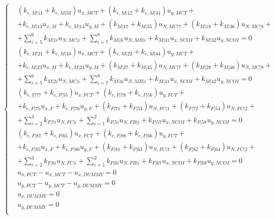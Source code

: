 \documentclass[a4paper]{jpconf}
\begin{document}
\begin{equation}
\begin{cases}
&\left(k_{e,M|11}+k_{e,M|33}\right)u_{x,MCT}+\left(k_{e,M|12}+k_{e,M|34}\right)u_{y,MCT}+\\&+k_{e,M|13}u_{x,M}+k_{e,M|14}u_{y,M}+\left(k_{M|17}+k_{M|35}\right)u_{N,MC|7}+\left(k_{M|18}+k_{M|36}\right)u_{N,MC|8}+\\&+\sum_{i=5}^{6}k_{M|1i}u_{N,MC|i}+\sum_{i=7}^{8}k_{M|3i}u_{N,MB|i}+k_{M|31}u_{x,NCOI}+k_{M|32}u_{y,NCOI}=0\\[10pt]
&\left(k_{e,M|21}+k_{e,M|43}\right)u_{x,MCT}+\left(k_{e,M|22}+k_{e,M|44}\right)u_{y,MCT}+\\&+k_{e,M|23}u_{x,M}+k_{e,M|24}u_{y,M}+\left(k_{M|27}+k_{M|45}\right)u_{N,MC|7}+\left(k_{M|28}+k_{M|46}\right)u_{N,MC|8}+\\&+\sum_{i=5}^{6}k_{M|2i}u_{N,MC|i}+\sum_{i=7}^{8}k_{M|4i}u_{N,MB|i}+k_{M|41}u_{x,NCOI}+k_{M|42}u_{y,NCOI}=0\\[10pt]
&\left(k_{e,F|77}+k_{e,F|55}\right)u_{x,FCT}+\left(k_{e,F|78}+k_{e,F|56}\right)u_{y,FCT}+\\&+k_{e,F|75}u_{x,F}+k_{e,F|76}u_{y,F}+\left(k_{F|71}+k_{F|53}\right)u_{N,FC|1}+\left(k_{F|72}+k_{F|54}\right)u_{N,FC|2}+\\&+\sum_{i=2}^{3}k_{F|7i}u_{N,FC|i}+\sum_{i=1}^{2}k_{F|5i}u_{N,FB|i}+k_{F|57}u_{x,NCOI}+k_{F|58}u_{y,NCOI}=0\\[10pt]
&\left(k_{e,F|87}+k_{e,F|65}\right)u_{x,FCT}+\left(k_{e,F|88}+k_{e,F|66}\right)u_{y,FCT}+\\&+k_{e,F|85}u_{x,F}+k_{e,F|86}u_{y,F}+\left(k_{F|81}+k_{F|63}\right)u_{N,FC|1}+\left(k_{F|82}+k_{F|64}\right)u_{N,FC|2}+\\&+\sum_{i=2}^{3}k_{F|8i}u_{N,FC|i}+\sum_{i=1}^{2}k_{F|6i}u_{N,FB|i}+k_{F|67}u_{x,NCOI}+k_{F|68}u_{y,NCOI}=0\\[10pt]
&u_{x,FCT}-u_{x,MCT}-u_{x,DUMMY}=0\\
&u_{y,FCT}-u_{y,MCT}-u_{y,DUMMY}=0\\[10pt]
&u_{x,DUMMY}=0\\
&u_{y,DUMMY}=0\\
\end{cases}
\end{equation}
\end{document}
